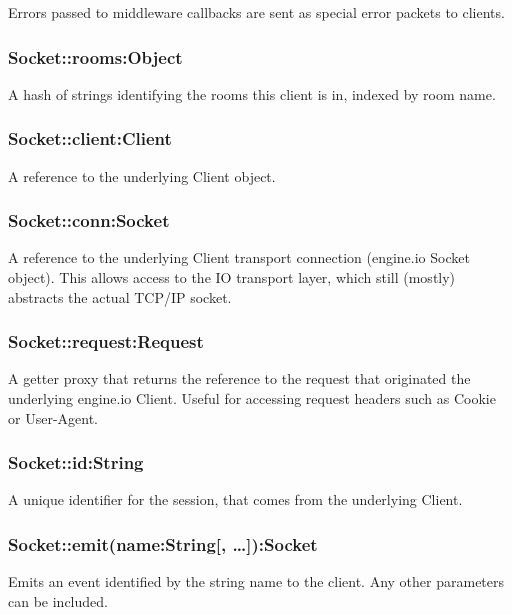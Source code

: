 Errors passed to middleware callbacks are sent as special {\ttfamily error} packets to clients.

\subsubsection*{Socket\+::rooms\+:Object}

A hash of strings identifying the rooms this client is in, indexed by room name.

\subsubsection*{Socket\+::client\+:Client}

A reference to the underlying {\ttfamily Client} object.

\subsubsection*{Socket\+::conn\+:Socket}

A reference to the underlying {\ttfamily Client} transport connection (engine.\+io {\ttfamily Socket} object). This allows access to the IO transport layer, which still (mostly) abstracts the actual T\+C\+P/\+IP socket.

\subsubsection*{Socket\+::request\+:Request}

A getter proxy that returns the reference to the {\ttfamily request} that originated the underlying engine.\+io {\ttfamily Client}. Useful for accessing request headers such as {\ttfamily Cookie} or {\ttfamily User-\/\+Agent}.

\subsubsection*{Socket\+::id\+:String}

A unique identifier for the session, that comes from the underlying {\ttfamily Client}.

\subsubsection*{Socket\+::emit(name\+:String\mbox{[}, …\mbox{]})\+:Socket}

Emits an event identified by the string {\ttfamily name} to the client. Any other parameters can be included.


